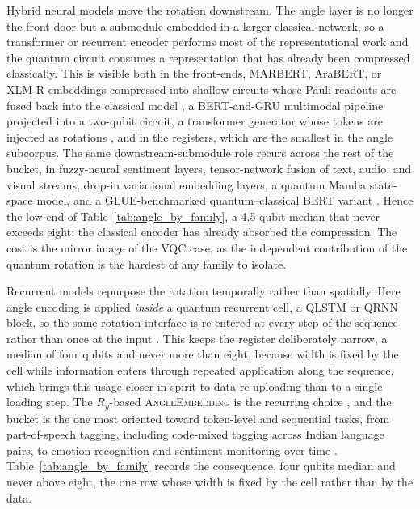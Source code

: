 \documentclass{ieeeaccess}
\begin{document}
Hybrid neural models move the rotation downstream. The angle layer is no longer the front door but a submodule embedded in a larger classical network, so a transformer or recurrent encoder performs most of the representational work and the quantum circuit consumes a representation that has already been compressed classically. This is visible both in the front-ends, MARBERT, AraBERT, or XLM-R embeddings compressed into shallow circuits whose Pauli readouts are fused back into the classical model \cite{suleiman_hdqe_2026}, a BERT-and-GRU multimodal pipeline projected into a two-qubit circuit, a transformer generator whose tokens are injected as rotations \cite{routh_hybrid_2025}, and in the registers, which are the smallest in the angle subcorpus. The same downstream-submodule role recurs across the rest of the bucket, in fuzzy-neural sentiment layers, tensor-network fusion of text, audio, and visual streams, drop-in variational embedding layers, a quantum Mamba state-space model, and a GLUE-benchmarked quantum--classical BERT variant \cite{dave_sentiqnf_2026,li_qd-msa_2025,li_qmlsc_2025,roshan_ahmed_deepket-_2024,stenzel_qmamba_2025,yao_self-supervised_2025}. Hence the low end of Table~\ref{tab:angle_by_family}, a 4.5-qubit median that never exceeds eight: the classical encoder has already absorbed the compression. The cost is the mirror image of the VQC case, as the independent contribution of the quantum rotation is the hardest of any family to isolate.

Recurrent models repurpose the rotation temporally rather than spatially. Here angle encoding is applied \emph{inside} a quantum recurrent cell, a QLSTM or QRNN block, so the same rotation interface is re-entered at every step of the sequence rather than once at the input \cite{stein_applying_2023,kesiku_quantum_2025,yu_application_2024,diaz-ortiz_strongly_2024}. This keeps the register deliberately narrow, a median of four qubits and never more than eight, because width is fixed by the cell while information enters through repeated application along the sequence, which brings this usage closer in spirit to data re-uploading than to a single loading step. The $R_y$-based \textsc{AngleEmbedding} is the recurring choice \cite{kesiku_quantum_2025}, and the bucket is the one most oriented toward token-level and sequential tasks, from part-of-speech tagging, including code-mixed tagging across Indian language pairs, to emotion recognition and sentiment monitoring over time \cite{pandey_quantum_2026,pandey_quantum_2023,rawat_mental_2026,vm_hybrid_2026,xu_quantum_2024}. Table~\ref{tab:angle_by_family} records the consequence, four qubits median and never above eight, the one row whose width is fixed by the cell rather than by the data.
\end{document}
